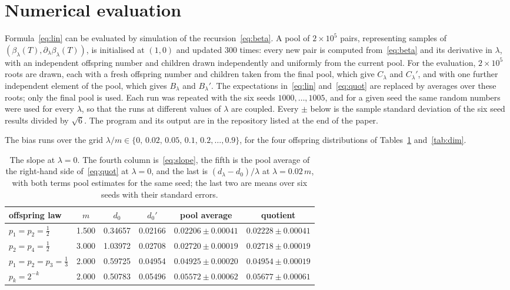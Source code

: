 \documentclass[11pt]{amsart}
\theoremstyle{definition}
\begin{document}
\section{Numerical evaluation}\label{sec:numerics}

Formula~\eqref{eq:lin} can be evaluated by simulation of the recursion~\eqref{eq:beta}. A pool of $2\times10^5$
pairs, representing samples of $(\beta_\lambda(T),\partial_\lambda\beta_\lambda(T))$, is initialised at $(1,0)$
and updated $300$ times: every new pair is computed from~\eqref{eq:beta} and its derivative in $\lambda$, with an
independent offspring number and children drawn independently and uniformly from the current pool. For the
evaluation, $2\times10^5$ roots are drawn, each with a fresh offspring number and children taken from the final
pool, which give $C_\lambda$ and $C_\lambda'$, and with one further independent element of the pool, which gives
$B_\lambda$ and $B_\lambda'$. The expectations in~\eqref{eq:lin} and~\eqref{eq:quot} are replaced by averages over
these roots; only the final pool is used. Each run was repeated with the six seeds $1000,\dots,1005$, and for a
given seed the same random numbers were used for every $\lambda$, so that the runs at different values of
$\lambda$ are coupled. Every $\pm$ below is the sample standard deviation of the six seed results divided by
$\sqrt6$. The program and its output are in the repository listed at the end of the paper.

The bias runs over the grid $\lambda/m\in\{0,\,0.02,\,0.05,\,0.1,\,0.2,\dots,0.9\}$, for the four offspring
distributions of Tables~\ref{tab:slope} and~\ref{tab:dim}.

\begin{table}[ht]\centering\small
\begin{tabular}{lccccc}\toprule
offspring law & $m$ & $d_0$ & $d_0'$ & pool average & quotient \\ \midrule
$p_1=p_2=\tfrac12$ & 1.500 & 0.34657 & 0.02166 & $0.02206\pm0.00041$ & $0.02228\pm0.00041$ \\
$p_2=p_4=\tfrac12$ & 3.000 & 1.03972 & 0.02708 & $0.02720\pm0.00019$ & $0.02718\pm0.00019$ \\
$p_1=p_2=p_3=\tfrac13$ & 2.000 & 0.59725 & 0.04954 & $0.04925\pm0.00020$ & $0.04954\pm0.00019$ \\
$p_k=2^{-k}$ & 2.000 & 0.50783 & 0.05496 & $0.05572\pm0.00062$ & $0.05677\pm0.00061$ \\
\bottomrule\end{tabular}
\caption{The slope at $\lambda=0$. The fourth column is~\eqref{eq:slope}, the fifth is the pool average of the
right-hand side of~\eqref{eq:quot} at $\lambda=0$, and the last is $(d_{\lambda}-d_0)/\lambda$ at
$\lambda=0.02\,m$, with both terms pool estimates for the same seed; the last two are means over six seeds with their standard errors.}\label{tab:slope}
\end{table}
\end{document}
